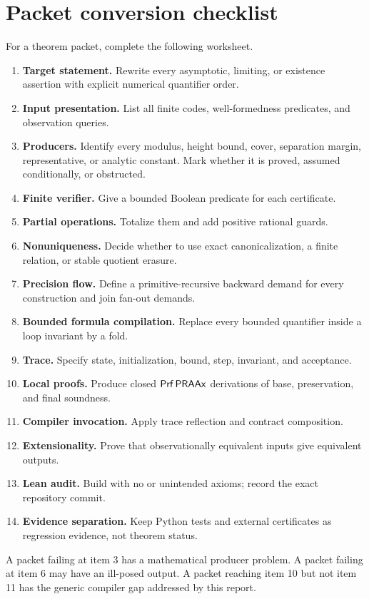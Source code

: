 \section{Packet conversion checklist}

For a theorem packet, complete the following worksheet.

\begin{enumerate}
\item \textbf{Target statement.}  Rewrite every asymptotic, limiting, or
existence assertion with explicit numerical quantifier order.
\item \textbf{Input presentation.}  List all finite codes, well-formedness
predicates, and observation queries.
\item \textbf{Producers.}  Identify every modulus, height bound, cover,
separation margin, representative, or analytic constant.  Mark whether it is
proved, assumed conditionally, or obstructed.
\item \textbf{Finite verifier.}  Give a bounded Boolean predicate for each
certificate.
\item \textbf{Partial operations.}  Totalize them and add positive rational
guards.
\item \textbf{Nonuniqueness.}  Decide whether to use exact canonicalization, a
finite relation, or stable quotient erasure.
\item \textbf{Precision flow.}  Define a primitive-recursive backward demand
for every construction and join fan-out demands.
\item \textbf{Bounded formula compilation.}  Replace every bounded quantifier
inside a loop invariant by a fold.
\item \textbf{Trace.}  Specify state, initialization, bound, step, invariant,
and acceptance.
\item \textbf{Local proofs.}  Produce closed \(\mathsf{Prf}\,\mathsf{PRAAx}\) derivations of
base, preservation, and final soundness.
\item \textbf{Compiler invocation.}  Apply trace reflection and contract
composition.
\item \textbf{Extensionality.}  Prove that observationally equivalent inputs
give equivalent outputs.
\item \textbf{Lean audit.}  Build with no  or unintended axioms;
record the exact repository commit.
\item \textbf{Evidence separation.}  Keep Python tests and external
certificates as regression evidence, not theorem status.
\end{enumerate}

A packet failing at item 3 has a mathematical producer problem.  A packet
failing at item 6 may have an ill-posed output.  A packet reaching item 10 but
not item 11 has the generic compiler gap addressed by this report.
